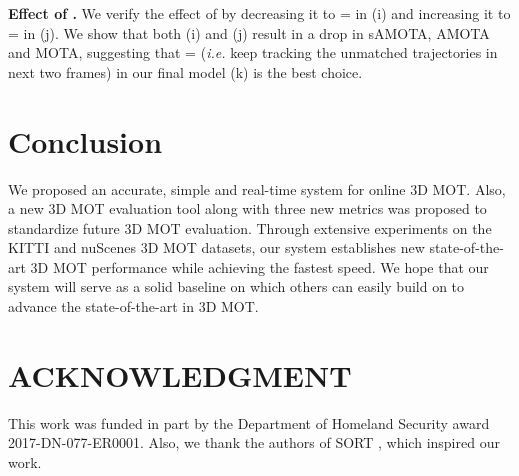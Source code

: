 \documentclass[letterpaper, 10 pt, conference]{ieeeconf}
\begin{document}
\vspace{1.5mm}\noindent\textbf{Effect of .} We verify the effect of  by decreasing it to = in (i) and increasing it to = in (j). We show that both (i) and (j) result in a drop in sAMOTA, AMOTA and MOTA, suggesting that = (\emph{i.e.} keep tracking the unmatched trajectories  in next two frames) in our final model (k) is the best choice.



\vspace{-0.1cm}
\section{Conclusion}

We proposed an accurate, simple and real-time system for online 3D MOT. Also, a new 3D MOT evaluation tool along with three new metrics was proposed to standardize future 3D MOT evaluation. Through extensive experiments on the KITTI and nuScenes 3D MOT datasets, our system establishes new state-of-the-art 3D MOT performance while achieving the fastest speed. We hope that our system will serve as a solid baseline on which others can easily build on to advance the state-of-the-art in 3D MOT. 













\vspace{-0.1cm}
\section*{ACKNOWLEDGMENT}

This work was funded in part by the Department of Homeland Security award 2017-DN-077-ER0001. Also, we thank the authors of SORT \cite{Bewley2016}, which inspired our work.



\end{document}
